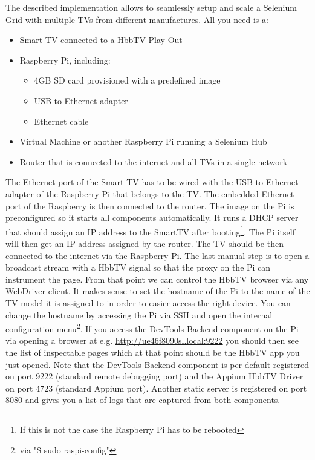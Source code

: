 The described implementation allows to seamlessly setup and scale a Selenium Grid with multiple TVs from different
manufactures. All you need is a:

\begin{itemize}
  \item Smart TV connected to a HbbTV Play Out
  \item Raspberry Pi, including:
    \begin{itemize}
      \item 4GB SD card provisioned with a predefined image
      \item USB to Ethernet adapter
      \item Ethernet cable
    \end{itemize}
  \item Virtual Machine or another Raspberry Pi running a Selenium Hub
  \item Router that is connected to the internet and all TVs in a single network
\end{itemize}

The Ethernet port of the Smart TV has to be wired with the USB to Ethernet adapter of the Raspberry Pi that belongs
to the TV. The embedded Ethernet port of the Raspberry is then connected to the router. The image on the Pi is
preconfigured so it starts all components automatically. It runs a DHCP server that should assign an IP address to the
SmartTV after booting\footnote{If this is not the case the Raspberry Pi has to be rebooted}. The Pi itself will then
get an IP address assigned by the router. The TV should be then connected to the internet via the Raspberry Pi. The
last manual step is to open a broadcast stream with a HbbTV signal so that the proxy on the Pi can instrument the page.
From that point we can control the HbbTV browser via any WebDriver client. It makes sense to set the hostname of the Pi
to the name of the TV model it is assigned to in order to easier access the right device. You can change the hostname by accessing
the Pi via SSH and open the internal configuration menu\footnote{via "\$ sudo raspi-config"}. If you access the DevTools
Backend component on the Pi via opening a browser at e.g. \url{http://ue46f8090sl.local:9222} you should then see the
list of inspectable pages which at that point should be the HbbTV app you just opened. Note that the DevTools Backend
component is per default registered on port 9222 (standard remote debugging port) and the Appium HbbTV Driver on port
4723 (standard Appium port). Another static server is registered on port 8080 and gives you a list of logs that are
captured from both components.

